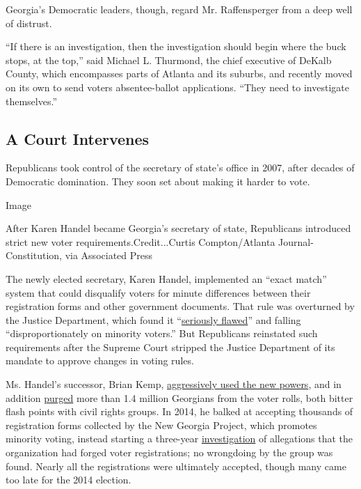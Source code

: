 Georgia's Democratic leaders, though, regard Mr. Raffensperger from a
deep well of distrust.

``If there is an investigation, then the investigation should begin
where the buck stops, at the top,'' said Michael L. Thurmond, the chief
executive of DeKalb County, which encompasses parts of Atlanta and its
suburbs, and recently moved on its own to send voters absentee-ballot
applications. ``They need to investigate themselves.''

\hypertarget{a-court-intervenes}{%
\subsection{A Court Intervenes}\label{a-court-intervenes}}

Republicans took control of the secretary of state's office in 2007,
after decades of Democratic domination. They soon set about making it
harder to vote.

Image

After Karen Handel became Georgia's secretary of state, Republicans
introduced strict new voter requirements.Credit...Curtis Compton/Atlanta
Journal-Constitution, via Associated Press

The newly elected secretary, Karen Handel, implemented an ``exact
match'' system that could disqualify voters for minute differences
between their registration forms and other government documents. That
rule was overturned by the Justice Department, which found it
``\href{https://www.justice.gov/crt/voting-determination-letter-58}{seriously
flawed}'' and falling ``disproportionately on minority voters.'' But
Republicans reinstated such requirements after the Supreme Court
stripped the Justice Department of its mandate to approve changes in
voting rules.

Ms. Handel's successor, Brian Kemp,
\href{https://www.bloomberg.com/news/articles/2018-10-15/how-georgia-s-exact-match-program-was-made-possible}{aggressively
used the new powers}, and in addition
\href{https://www.nytimes.com/2019/03/06/us/politics/governor-brian-kemp-voter-suppression.html}{purged}
more than 1.4 million Georgians from the voter rolls, both bitter flash
points with civil rights groups. In 2014, he balked at accepting
thousands of registration forms collected by the New Georgia Project,
which promotes minority voting, instead starting a three-year
\href{https://www.wsbtv.com/news/local/state-launches-fraud-investigation-voter-registrat/137992052/}{investigation}
of allegations that the organization had forged voter registrations; no
wrongdoing by the group was found. Nearly all the registrations were
ultimately accepted, though many came too late for the 2014 election.

